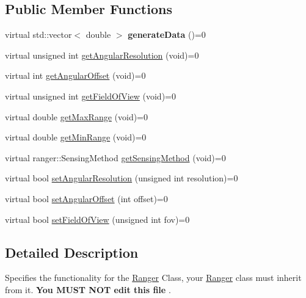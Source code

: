 \subsection*{Public Member Functions}
\begin{DoxyCompactItemize}
\item 
virtual std\+::vector$<$ double $>$ {\bfseries generate\+Data} ()=0\hypertarget{class_ranger_interface_a969c670cadf55a15733809116dc305c8}{}\label{class_ranger_interface_a969c670cadf55a15733809116dc305c8}

\item 
virtual unsigned int \hyperlink{class_ranger_interface_a37d4f89daffa8b2708dfc11034893552}{get\+Angular\+Resolution} (void)=0
\item 
virtual int \hyperlink{class_ranger_interface_a3af867912dfc4f2cf899f53b82e85130}{get\+Angular\+Offset} (void)=0
\item 
virtual unsigned int \hyperlink{class_ranger_interface_a18716da6932402b8dda75f682be6f06c}{get\+Field\+Of\+View} (void)=0
\item 
virtual double \hyperlink{class_ranger_interface_a0bb29a41de5767c99081002c0590c186}{get\+Max\+Range} (void)=0
\item 
virtual double \hyperlink{class_ranger_interface_ae6d501ddeeaad4a7b44d7d51ce64cb88}{get\+Min\+Range} (void)=0
\item 
virtual ranger\+::\+Sensing\+Method \hyperlink{class_ranger_interface_aeb06b9835f2b162b81917bd27797549b}{get\+Sensing\+Method} (void)=0
\item 
virtual bool \hyperlink{class_ranger_interface_aecffc9bbb58379da741c18326b9e41db}{set\+Angular\+Resolution} (unsigned int resolution)=0
\item 
virtual bool \hyperlink{class_ranger_interface_a2ac537778d99306a378d151c544426dc}{set\+Angular\+Offset} (int offset)=0
\item 
virtual bool \hyperlink{class_ranger_interface_a70357ca516198af45e2d503ef6af8f9f}{set\+Field\+Of\+View} (unsigned int fov)=0
\end{DoxyCompactItemize}


\subsection{Detailed Description}
Specifies the functionality for the \hyperlink{class_ranger}{Ranger} Class, your \hyperlink{class_ranger}{Ranger} class must inherit from it. {\bfseries  You M\+U\+ST N\+OT edit this file }. 

